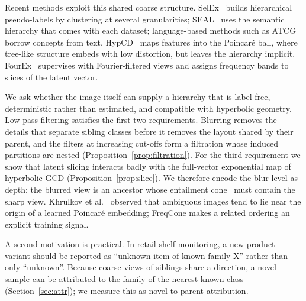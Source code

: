 \documentclass[10pt]{article}
\begin{document}
Recent methods exploit this shared coarse structure. SelEx~\cite{rastegar2024selex} builds hierarchical
pseudo-labels by clustering at several granularities; SEAL~\cite{he2025seal} uses the semantic hierarchy that
comes with each dataset; language-based methods such as ATCG~\cite{atcg2026} borrow concepts from text.
HypCD~\cite{liu2025hypcd} maps features into the Poincar\'e ball, where tree-like structure embeds with low
distortion, but leaves the hierarchy implicit. FourEx~\cite{rastegar2026fourex} supervises with
Fourier-filtered views and assigns frequency bands to slices of the latent vector.

We ask whether the image itself can supply a hierarchy that is label-free, deterministic rather than
estimated, and compatible with hyperbolic geometry. Low-pass filtering satisfies the first two requirements.
Blurring removes the details that separate sibling classes before it removes the layout shared by their
parent, and the filters at increasing cut-offs form a filtration whose induced partitions are nested
(Proposition~\ref{prop:filtration}). For the third requirement we show that latent slicing interacts badly
with the full-vector exponential map of hyperbolic GCD (Proposition~\ref{prop:slice}). We therefore encode the
blur level as depth: the blurred view is an ancestor whose entailment cone~\cite{ganea2018cones} must contain
the sharp view. Khrulkov et al.~\cite{khrulkov2020hyperbolic} observed that ambiguous images tend to lie near
the origin of a learned Poincar\'e embedding; FreqCone makes a related ordering an explicit training signal.

A second motivation is practical. In retail shelf monitoring, a new product variant should be reported as
``unknown item of known family X'' rather than only ``unknown''. Because coarse views of siblings share a
direction, a novel sample can be attributed to the family of the nearest known class
(Section~\ref{sec:attr}); we measure this as novel-to-parent attribution.
\end{document}
